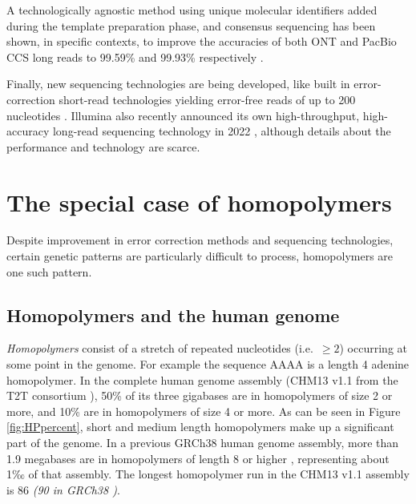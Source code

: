 \documentclass[
  11pt,
  twoside]{scrbook}
\begin{document}
A technologically agnostic method using unique molecular identifiers added during the template preparation phase, and consensus sequencing has been shown, in specific contexts, to improve the accuracies of both ONT and PacBio CCS long reads to 99.59\% and 99.93\% respectively \autocite{karstHighaccuracyLongreadAmplicon2021}.

Finally, new sequencing technologies are being developed, like built in error-correction short-read technologies yielding error-free reads of up to 200 nucleotides \autocite{chenHighlyAccurateFluorogenic2017}. Illumina also recently announced its own high-throughput, high-accuracy long-read sequencing technology in 2022 \autocite{HighPerformanceLong}, although details about the performance and technology are scarce.

\hypertarget{the-special-case-of-homopolymers}{%
\section{The special case of homopolymers}\label{the-special-case-of-homopolymers}}

Despite improvement in error correction methods and sequencing technologies, certain genetic patterns are particularly difficult to process, homopolymers are one such pattern.

\hypertarget{homopolymers-and-the-human-genome}{%
\subsection{Homopolymers and the human genome}\label{homopolymers-and-the-human-genome}}

\emph{Homopolymers} consist of a stretch of repeated nucleotides (i.e.~\(\geq 2\)) occurring at some point in the genome. For example the sequence AAAA is a length 4 adenine homopolymer. In the complete human genome assembly (CHM13 v1.1 from the T2T consortium \autocite{nurk2022}), 50\% of its three gigabases are in homopolymers of size 2 or more, and 10\% are in homopolymers of size 4 or more. As can be seen in Figure \ref{fig:HPpercent}, short and medium length homopolymers make up a significant part of the genome. In a previous GRCh38 human genome assembly, more than 1.9 megabases are in homopolymers of length 8 or higher \autocite{booeshaghiPseudoalignmentFacilitatesAssignment2022}, representing about 1‰ of that assembly. The longest homopolymer run in the CHM13 v1.1 assembly is 86 \emph{(90 in GRCh38 \autocite{booeshaghiPseudoalignmentFacilitatesAssignment2022})}.
\end{document}
